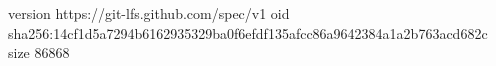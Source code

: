 version https://git-lfs.github.com/spec/v1
oid sha256:14cf1d5a7294b6162935329ba0f6efdf135afcc86a9642384a1a2b763acd682c
size 86868
